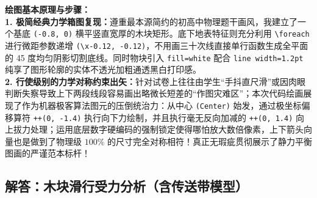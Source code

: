 \vspace{0.6cm}

{\small\color{blue!70!black}
\textbf{绘图基本原理与步骤：}\\
\textbf{1. 极简经典力学箱图复现：}遵重最本源简约的初高中物理题干画风，我建立了一个基底 \texttt{(-0.8, 0)} 横平竖直宽厚的木块矩形。底下地表特征则充分利用 \texttt{\textbackslash foreach} 进行微距参数递增 \texttt{(\textbackslash x-0.12, -0.12)}，不用画三十次线直接单行函数生成全平面的 45 度均匀阴影切割底线。同时物块引入 \texttt{fill=white} 配合 \texttt{line width=1.2pt} 纯享了图形轮廓的实体不透光加粗通透黑白打印感。\\
\textbf{2. 行使级别的力学对称约束出矢：}针对试卷上往往由学生“手抖直尺滑”或因肉眼判断失察导致上下两段线段容易画出略微长短差的“作图灾难区”；本次代码绘画展现了作为机器极客算法图元的压倒统治力：从中心 \texttt{(Center)} 始发，通过极坐标偏移算符 \texttt{++(0, -1.4)} 执行向下力绘制，并且执行毫无反向加减的 \texttt{++(0, 1.4)} 向上拔力处理；运用底层数字硬编码的强制锁定使得哪怕放大数倍像素，上下箭头向量也是做到了物理级 $100\%$ 的尺寸完全对称相符！真正无瑕疵贯彻展示了静力平衡图画的严谨范本标杆！
}


\newpage

\subsection{解答：木块滑行受力分析（含传送带模型）}

\vspace{0.6cm}

